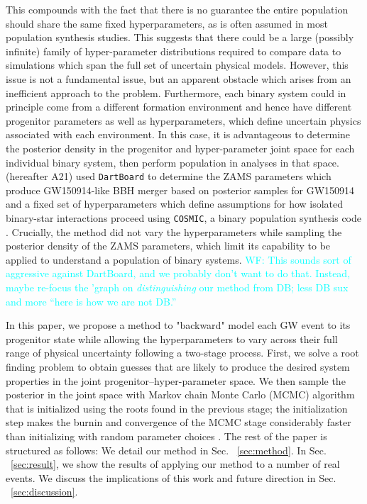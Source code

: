 \documentclass[twocolumn]{aastex631}
\newcommand{\wf}[1]{\textcolor{cyan}{WF: #1}}
\begin{document}
This compounds with the fact that there is no guarantee the entire population
should share the same fixed hyperparameters, as is often assumed in most
population synthesis studies. This suggests that there could be a large
(possibly infinite) family of hyper-parameter distributions required to compare
data to simulations which span the full set of uncertain physical models.
However, this issue is not a fundamental issue, but an apparent obstacle which
arises from an inefficient approach to the problem. Furthermore, each binary
system could in principle come from a different formation environment and hence
have different progenitor parameters as well as hyperparameters, which define
uncertain physics associated with each environment. In this case, it is
advantageous to determine the posterior density in the progenitor and
hyper-parameter joint space for each individual binary system, then perform
population in analyses in that space. \citet{Andrews2021} (hereafter A21) used
\texttt{DartBoard} \citep{Andrews2018} to determine the ZAMS parameters which
produce GW150914-like BBH merger based on posterior samples for GW150914 and a
fixed set of hyperparameters which define assumptions for how isolated
binary-star interactions proceed using \texttt{COSMIC}, a binary population
synthesis code \citep{Breivik2020}. Crucially, the method did not vary the
hyperparameters while sampling the posterior density of the ZAMS parameters,
which limit its capability to be applied to understand a population of binary
systems.  \wf{This sounds sort of aggressive against DartBoard, and we probably
don't want to do that.  Instead, maybe re-focus the 'graph on
\emph{distinguishing} our method from DB; less DB sux and more ``here is how we
are not DB.''}

In this paper, we propose a method to "backward" model each GW event to its
progenitor state while allowing the hyperparameters to vary across their full
range of physical uncertainty following a two-stage process. First, we solve a
root finding problem to obtain guesses that are likely to produce the desired
system properties in the joint progenitor--hyper-parameter space. We then sample
the posterior in the joint space with Markov chain Monte Carlo (MCMC) algorithm
that is initialized using the roots found in the previous stage; the
initialization step makes the burnin and convergence of the MCMC stage
considerably faster than initializing with random parameter choices
\citep{Andrews2018,Andrews2021}. The rest of the paper is structured as follows:
We detail our method in Sec. ~\ref{sec:method}. In Sec. ~\ref{sec:result}, we
show the results of applying our method to a number of real events. We discuss
the implications of this work and future direction in Sec.
~\ref{sec:discussion}.
\end{document}
